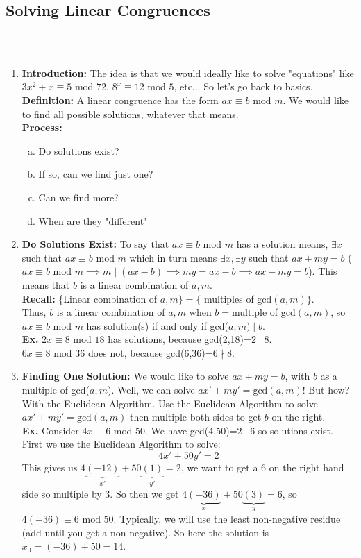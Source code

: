 \documentclass[class=article, crop=false]{standalone}
\begin{document}
\subsection{Solving Linear Congruences}
\rule{\textwidth}{1pt}\\
\begin{enumerate}[1.]
	\item \textbf{Introduction:} The idea is that we would ideally like to solve "equations" like
	$3x^2+x\equiv 5\mbox{ mod }72$, $8^x\equiv 12\mbox{ mod }5$, etc... So let's go back to basics.\\
	\textbf{Definition:} A linear congruence has the form $ax\equiv b\mbox{ mod }m$. We would like to
	find all possible solutions, whatever that means.\\
	\textbf{Process:}
	\begin{enumerate}[(a)]
		\item Do solutions exist?
		\item If so, can we find just one?
		\item Can we find more?
		\item When are they "different"
	\end{enumerate}
	
	\item \textbf{Do Solutions Exist:} To say that $ax\equiv b\mbox{ mod }m$ has a solution means,
	$\exists x$ such that $ax\equiv b\mbox{ mod }m$ which in turn means $\exists x, \exists y$ such
	that $ax+my=b$ ($ax\equiv b\mbox{ mod }m \implies m \mid (ax-b)\implies my=ax-b \implies ax-my=b$).
	This means that $b$ is a linear combination of $a,m$.\\
	\textbf{Recall:} \{Linear combination of $a,m\} = \{$ multiples of gcd$(a,m)\}$.\\
	Thus, $b$ is a linear combination of $a,m$ when $b=$multiple of gcd$(a,m)$, so 
	$ax\equiv b\mbox{ mod }m$ has solution(s) if and only if gcd($a,m)\mid b$.\\
	\textbf{Ex.} $2x\equiv 8\mbox{ mod }18$ has solutions, because gcd(2,18)=$2\mid8$.\\
	$6x\equiv 8\mbox{ mod }36$ does not, because gcd(6,36)=$6\nmid 8$.
	
	\item \textbf{Finding One Solution:} We would like to solve $ax+my=b$, with $b$ as a multiple of
	gcd($a,m$). Well, we can solve $ax'+my'=\mbox{gcd}(a,m)$! But how? With the Euclidean Algorithm.
	Use the Euclidean Algorithm to solve $ax'+my'=\mbox{gcd}(a,m)$ then multiple both sides to get $b$ on the right.\\
	\textbf{Ex.} Consider $4x\equiv 6\mbox{ mod }50$. We have gcd(4,50)=$2\mid 6$ so solutions exist.
	First we use the Euclidean Algorithm to solve: $$4x'+50y'=2$$
	This gives us $4 \underbrace{(-12)}_{x'}+50\underbrace{(1)}_{y'}=2$, we want to get a $6$ on the right hand side so multiple by $3$.
	So then we get $4 \underbrace{(-36)}_{x}+50\underbrace{(3)}_{y}=6$, so $4(-36)\equiv 6\mbox{ mod }50$.
	Typically, we will use the least non-negative residue (add until you get a non-negative). So here
	the solution is $x_0 = (-36)+50 = 14$.
	

\end{enumerate}
\end{document}
